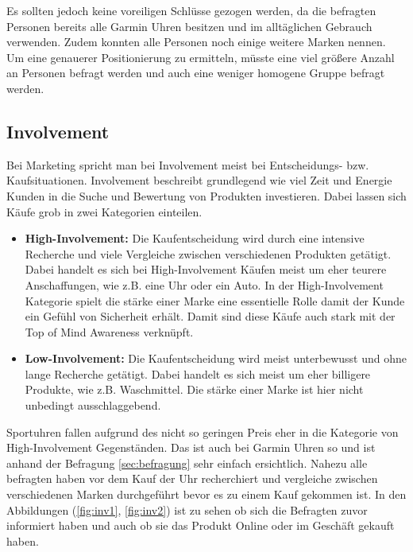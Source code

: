 Es sollten jedoch keine voreiligen Schlüsse gezogen werden, da die befragten Personen bereits alle Garmin Uhren besitzen und im alltäglichen Gebrauch verwenden. Zudem konnten alle Personen noch einige weitere Marken nennen. Um eine genauerer Positionierung zu ermitteln, müsste eine viel größere Anzahl an Personen befragt werden und auch eine weniger homogene Gruppe befragt werden.

\subsection{Involvement}
Bei Marketing spricht man bei Involvement meist bei Entscheidungs- bzw. Kaufsituationen. Involvement beschreibt grundlegend wie viel Zeit und Energie Kunden in die Suche und Bewertung von Produkten investieren. Dabei lassen sich Käufe grob in zwei Kategorien einteilen.
\begin{itemize}
    \item \textbf{High-Involvement:} Die Kaufentscheidung wird durch eine intensive Recherche und viele Vergleiche zwischen verschiedenen Produkten getätigt. Dabei handelt es sich bei High-Involvement Käufen meist um eher teurere Anschaffungen, wie z.B. eine Uhr oder ein Auto. In der High-Involvement Kategorie spielt die stärke einer Marke eine essentielle Rolle damit der Kunde ein Gefühl von Sicherheit erhält. Damit sind diese Käufe auch stark mit der Top of Mind Awareness verknüpft.
    \item \textbf{Low-Involvement:}
    Die Kaufentscheidung wird meist unterbewusst und ohne lange Recherche getätigt. Dabei handelt es sich meist um eher billigere Produkte, wie z.B. Waschmittel. Die stärke einer Marke ist hier nicht unbedingt ausschlaggebend. \cite{Involvement-1} \cite{Involvement-2}
\end{itemize}

Sportuhren fallen aufgrund des nicht so geringen Preis eher in die Kategorie von High-Involvement Gegenständen. Das ist auch bei Garmin Uhren so und ist anhand der Befragung \ref{sec:befragung} sehr einfach ersichtlich. Nahezu alle befragten haben vor dem Kauf der Uhr recherchiert und vergleiche zwischen verschiedenen Marken durchgeführt bevor es zu einem Kauf gekommen ist. In den Abbildungen (\ref{fig:inv1}, \ref{fig:inv2}) ist zu sehen ob sich die Befragten zuvor informiert haben und auch ob sie das Produkt Online oder im Geschäft gekauft haben.

